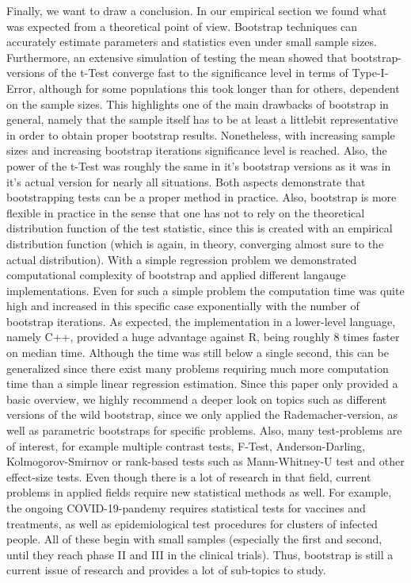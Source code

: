 Finally, we want to draw a conclusion. In our empirical section we found what was expected from a theoretical point of view. Bootstrap techniques can accurately estimate parameters and statistics even under small sample sizes. Furthermore, an extensive simulation of testing the mean showed that bootstrap-versions of the t-Test converge fast to the significance level in terms of Type-I-Error, although for some populations this took longer than for others, dependent on the sample sizes. This highlights one of the main drawbacks of bootstrap in general, namely that the sample itself has to be at least a littlebit representative in order to obtain proper bootstrap results. Nonetheless, with increasing sample sizes and increasing bootstrap iterations significance level is reached. Also, the power of the t-Test was roughly the same in it's bootstrap versions as it was in it's actual version for nearly all situations. Both aspects demonstrate that bootstrapping tests can be a proper method in practice. Also, bootstrap is more flexible in practice in the sense that one has not to rely on the theoretical distribution function of the test statistic, since this is created with an empirical distribution function (which is again, in theory, converging almost sure to the actual distribution). With a simple regression problem we demonstrated computational complexity of bootstrap and applied different langauge implementations. Even for such a simple problem the computation time was quite high and increased in this specific case exponentially with the number of bootstrap iterations. As expected, the implementation in a lower-level language, namely C++, provided a huge advantage against R, being roughly $8$ times faster on median time. Although the time was still below a single second, this can be generalized since there exist many problems requiring much more computation time than a simple linear regression estimation. Since this paper only provided a basic overview, we highly recommend a deeper look on topics such as different versions of the wild bootstrap, since we only applied the Rademacher-version, as well as parametric bootstraps for specific problems. Also, many test-problems are of interest, for example multiple contrast tests, F-Test, Anderson-Darling, Kolmogorov-Smirnov or rank-based tests such as Mann-Whitney-U test and other effect-size tests. Even though there is a lot of research in that field, current problems in applied fields require new statistical methods as well. For example, the ongoing COVID-19-pandemy requires statistical tests for vaccines and treatments, as well as epidemiological test procedures for clusters of infected people. All of these begin with small samples (especially the first and second, until they reach phase II and III in the clinical trials). Thus, bootstrap is still a current issue of research and provides a lot of sub-topics to study.